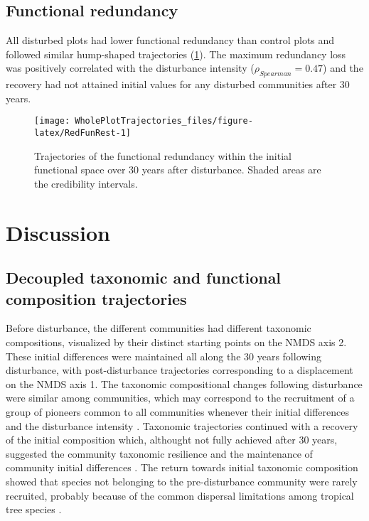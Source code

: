 \documentclass[fleqn,10pt]{ArtEcoFoG} %
\begin{document}
\subsection{Functional redundancy}\label{functional-redundancy}

All disturbed plots had lower functional redundancy than control plots
and followed similar hump-shaped trajectories (\ref{fig:RedFunRest}).
The maximum redundancy loss was positively correlated with the
disturbance intensity (\(\rho_{Spearman}=0.47\)) and the recovery had
not attained initial values for any disturbed communities after 30
years.

\begin{figure}

{\centering \texttt{[image: WholePlotTrajectories\_files/figure-latex/RedFunRest-1]} 

}

\caption{Trajectories of the functional redundancy within the initial functional space over 30 years after disturbance. Shaded areas are the credibility intervals.}\label{fig:RedFunRest}
\end{figure}

\section{Discussion}\label{discussion}

\subsection{Decoupled taxonomic and functional composition
trajectories}\label{decoupled-taxonomic-and-functional-composition-trajectories}

Before disturbance, the different communities had different taxonomic
compositions, visualized by their distinct starting points on the NMDS
axis 2. These initial differences were maintained all along the 30 years
following disturbance, with post-disturbance trajectories corresponding
to a displacement on the NMDS axis 1. The taxonomic compositional
changes following disturbance were similar among communities, which may
correspond to the recruitment of a group of pioneers common to all
communities whenever their initial differences and the disturbance
intensity \citep{Denslow2000, Bongers2009}. Taxonomic trajectories
continued with a recovery of the initial composition which, althought
not fully achieved after 30 years, suggested the community taxonomic
resilience and the maintenance of community initial differences
\citep{Folke2006}. The return towards initial taxonomic composition
showed that species not belonging to the pre-disturbance community were
rarely recruited, probably because of the common dispersal limitations
among tropical tree species \citep{Svenning2005}.
\end{document}
